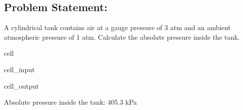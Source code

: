 \documentclass[letterpaper,10pt,english]{jupyterBook}
\begin{document}
\subsection{Problem Statement:}
\label{\detokenize{notebooks/Chapter2/Problem_1_Pressure_in_a_Tank:problem-statement}}
\sphinxAtStartPar
A cylindrical tank contains air at a gauge pressure of 3 atm and an ambient atmospheric pressure of 1 atm.
Calculate the absolute pressure inside the tank.

\begin{sphinxuseclass}{cell}\begin{sphinxVerbatimInput}

\begin{sphinxuseclass}{cell_input}
\begin{sphinxVerbatim}[commandchars=\\\{\}]

      
      

    

\end{sphinxVerbatim}

\end{sphinxuseclass}\end{sphinxVerbatimInput}
\begin{sphinxVerbatimOutput}

\begin{sphinxuseclass}{cell_output}
\begin{sphinxVerbatim}[commandchars=\\\{\}]
Absolute pressure inside the tank: 405.3 kPa
\end{sphinxVerbatim}

\end{sphinxuseclass}\end{sphinxVerbatimOutput}

\end{sphinxuseclass}
\sphinxstepscope
\end{document}
